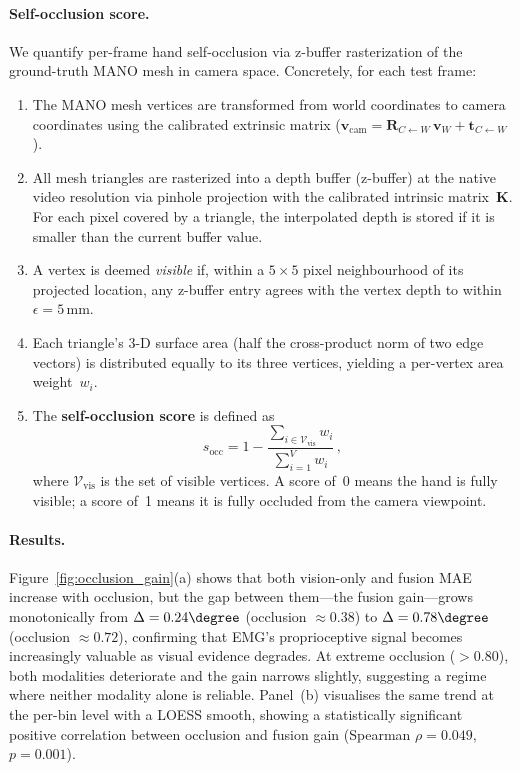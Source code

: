 \paragraph{Self-occlusion score.}
We quantify per-frame hand self-occlusion via z-buffer rasterization of the
ground-truth MANO mesh in camera space.  Concretely, for each test frame:
\begin{enumerate}[nosep]
  \item The MANO mesh vertices are transformed from world coordinates to camera
        coordinates using the calibrated extrinsic matrix ($\mathbf{v}_{\text{cam}} =
        \mathbf{R}_{C \leftarrow W}\,\mathbf{v}_W + \mathbf{t}_{C \leftarrow W}$).
  \item All mesh triangles are rasterized into a depth buffer (z-buffer) at the
        native video resolution via pinhole projection with the calibrated
        intrinsic matrix~$\mathbf{K}$.  For each pixel covered by a triangle, the
        interpolated depth is stored if it is smaller than the current buffer value.
  \item A vertex is deemed \emph{visible} if, within a $5 \times 5$ pixel
        neighbourhood of its projected location, any z-buffer entry agrees with
        the vertex depth to within $\epsilon = 5$\,mm.
  \item Each triangle's 3-D surface area (half the cross-product norm of two
        edge vectors) is distributed equally to its three vertices, yielding a
        per-vertex area weight~$w_i$.
  \item The \textbf{self-occlusion score} is defined as
        \begin{equation}
          s_{\text{occ}} = 1 - \frac{\sum_{i \in \mathcal{V}_{\text{vis}}} w_i}
                                     {\sum_{i=1}^{V} w_i}\,,
        \end{equation}
        where $\mathcal{V}_{\text{vis}}$ is the set of visible vertices.
        A score of~0 means the hand is fully visible; a score of~1 means it is
        fully occluded from the camera viewpoint.
\end{enumerate}

\paragraph{Results.}
Figure~\ref{fig:occlusion_gain}(a) shows that both vision-only and fusion MAE
increase with occlusion, but the gap between them---the fusion gain---grows
monotonically from $\Delta = 0.24\degree$ (occlusion $\approx 0.38$) to
$\Delta = 0.78\degree$ (occlusion $\approx 0.72$), confirming that EMG's
proprioceptive signal becomes increasingly valuable as visual evidence degrades.
At extreme occlusion ($> 0.80$), both modalities deteriorate and the gain
narrows slightly, suggesting a regime where neither modality alone is reliable.
Panel~(b) visualises the same trend at the per-bin level with a LOESS smooth,
showing a statistically significant positive correlation between occlusion and
fusion gain (Spearman $\rho = 0.049$, $p = 0.001$).
